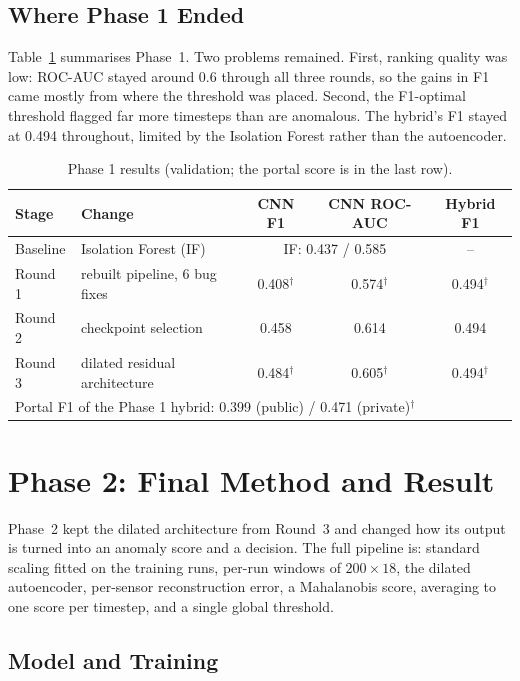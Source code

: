 \documentclass[runningheads]{llncs}
\newcommand{\doc}{$^\dagger$}
\begin{document}
\subsection{Where Phase 1 Ended}

Table~\ref{tab:phase1} summarises Phase~1. Two problems remained. First, ranking quality was low: ROC-AUC stayed around 0.6 through all three rounds, so the gains in F1 came mostly from where the threshold was placed. Second, the F1-optimal threshold flagged far more timesteps than are anomalous. The hybrid's F1 stayed at 0.494 throughout, limited by the Isolation Forest rather than the autoencoder.

\begin{table}[ht]
\centering
\caption{Phase 1 results (validation; the portal score is in the last row).}\label{tab:phase1}
\begin{tabular}{llccc}
\toprule
Stage & Change & CNN F1 & CNN ROC-AUC & Hybrid F1 \\
\midrule
Baseline & Isolation Forest (IF) & \multicolumn{2}{c}{IF: 0.437 / 0.585} & -- \\
Round 1 & rebuilt pipeline, 6 bug fixes & 0.408\doc & 0.574\doc & 0.494\doc \\
Round 2 & checkpoint selection & 0.458 & 0.614 & 0.494 \\
Round 3 & dilated residual architecture & 0.484\doc & 0.605\doc & 0.494\doc \\
\midrule
\multicolumn{5}{l}{Portal F1 of the Phase 1 hybrid: 0.399 (public) / 0.471 (private)\doc} \\
\bottomrule
\end{tabular}
\end{table}

\section{Phase 2: Final Method and Result}\label{sec:phase2}

Phase~2 kept the dilated architecture from Round~3 and changed how its output is turned into an anomaly score and a decision. The full pipeline is: standard scaling fitted on the training runs, per-run windows of $200 \times 18$, the dilated autoencoder, per-sensor reconstruction error, a Mahalanobis score, averaging to one score per timestep, and a single global threshold.

\subsection{Model and Training}
\end{document}
